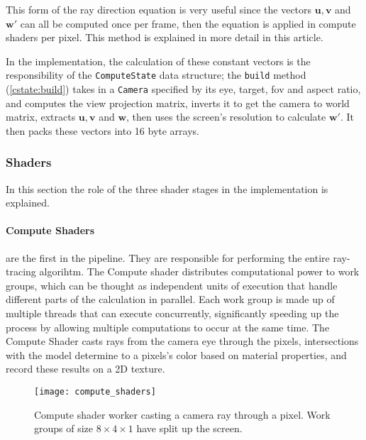This form of the ray direction equation is very useful since the vectors $\bm{u}, \bm{v}$ and $\bm{w'}$ can all be computed once per frame, then the equation is applied in compute shaders per pixel. This method is explained in more detail in this article\supercite{camera_rays}.


In the implementation, the calculation of these constant vectors is the responsibility of the \verb|ComputeState| data structure; the \verb|build| method (\cref{cstate:build}) takes in a \verb|Camera| specified by its eye, target, \acrshort{fov} and aspect ratio, and computes the view projection matrix, inverts it to get the camera to world matrix, extracts $\bm{u}, \bm{v}$ and $\bm{w}$, then uses the screen's resolution to calculate $\bm{w'}$. It then packs these vectors into 16 byte arrays.

\subsubsection{Shaders}
In this section the role of the three shader stages in the implementation is explained.

\begin{multicols}{2}
  \paragraph{Compute Shaders} are the first in the pipeline. They are responsible for performing the entire ray-tracing algorihtm. The Compute shader distributes computational power to work groups, which can be thought as independent units of execution that handle different parts of the calculation in parallel.
  Each work group is made up of multiple threads that can execute concurrently, significantly speeding up the process by allowing multiple computations to occur at the same time.
  The Compute Shader casts rays from the camera eye through the pixels, intersections with the model determine to a pixels's color based on material properties, and record these results on a 2D texture.

  \begin{figure}[H]
    \centering
    \texttt{[image: compute\_shaders]}
    \caption{Compute shader worker casting a camera ray through a pixel. Work groups of size $8\times4\times1$ have split up the screen.}
  \end{figure}
\end{multicols}
